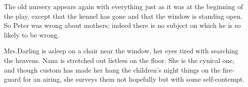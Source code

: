 

\begin{Settings}
The old nursery appears again with everything just as it was at the beginning of the play,
except that the kennel has gone and that the window is standing open.
So Peter was wrong about mothers;
indeed there is no subject on which he is so likely to be wrong.

Mrs.\@ Darling is asleep on a chair near the window, her eyes tired with searching the heavens.
Nana is stretched out listless on the floor.
She is the cynical one,
and though custom has made her hang the children’s night things on the fire‐guard for an airing,
she surveys them not hopefully but with some self‐contempt.
\end{Settings}

